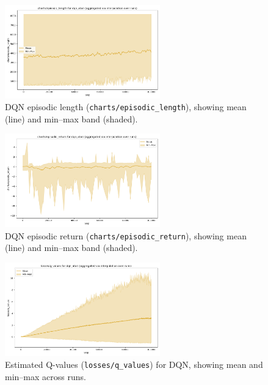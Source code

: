 \begin{figure}[htbp]
	\centering
	\includegraphics[width=0.6\textwidth]{figures/charts_episodic_length_dqn_atari.png}
	\caption{DQN episodic length (\texttt{charts/episodic\_length}), showing mean (line) and min--max band (shaded).}
	\label{fig:dqn_episodic_length}
\end{figure}

\begin{figure}[htbp]
	\centering
	\includegraphics[width=0.6\textwidth]{figures/charts_episodic_return_dqn_atari.png}
	\caption{DQN episodic return (\texttt{charts/episodic\_return}), showing mean (line) and min--max band (shaded).}
	\label{fig:dqn_episodic_return}
\end{figure}

\begin{figure}[htbp]
	\centering
	\includegraphics[width=0.6\textwidth]{figures/losses_q_values_dqn_atari.png}
	\caption{Estimated Q-values (\texttt{losses/q\_values}) for DQN, showing mean and min--max across runs.}
	\label{fig:dqn_q_values}
\end{figure}

